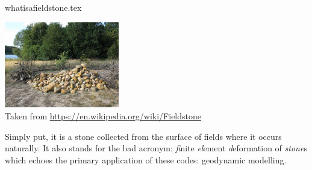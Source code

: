 \begin{flushright} {\tiny {\color{gray} whatisafieldstone.tex}} \end{flushright}

\begin{center}
\includegraphics[width=5cm]{images/fieldstone2}\\
{\captionfont Taken from \url{https://en.wikipedia.org/wiki/Fieldstone}}
\end{center}

Simply put, it is a stone collected from the surface of fields where it 
occurs naturally. It also stands for the bad acronym: {\sl fi}nite 
{\sl el}ement {\sl d}eformation of {\sl stone}s which echoes the primary 
application of these codes: geodynamic modelling.
